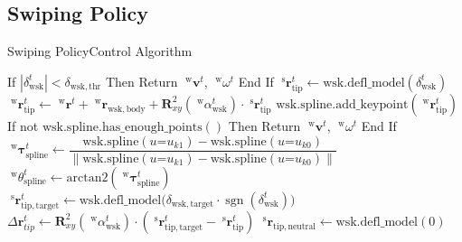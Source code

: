 \documentclass[AIRbeamer
,optEnglish
,optBiber
,optBibstyleAlphabetic
,optBeamerClassicFormat%
]{AIRlatex}
\begin{document}
    \subsection{Swiping Policy}
    \begin{frame}{Swiping Policy}{Control Algorithm}
        \begin{algorithm}[H]
            \caption{Swiping Policy}
            \begin{algorithmic}[1]
                {
                    \State If \(|\delta_{\mathrm{wsk}}^{t}| < \delta_{\mathrm{wsk, thr}}\)
                    Then
                    \State \quad Return \(\;^{\mathrm{w}}\boldsymbol{v}^{t}\), \(\;^{\mathrm{w}}\omega^{t}\)
                    \State End If
                    \State
                    \State \(\;^{\mathrm{s}}\boldsymbol{r}_{\mathrm{tip}}^{t} \gets \mathrm{wsk.defl\_model}(\delta_{\mathrm{wsk}}^{t})\)
                    \State \(\;^{\mathrm{w}}\boldsymbol{r}_{\mathrm{tip}}^{t} \gets \;^{\mathrm{w}}\boldsymbol{r}^{t} + \;^{\mathrm{w}}\boldsymbol{r}_{\mathrm{wsk, body}} + \boldsymbol{R}_{xy}^{2}(\; ^{\mathrm{w}}\alpha_{\mathrm{wsk}}^{t}) \cdot \;^{\mathrm{s}}\boldsymbol{r}_{\mathrm{tip}}^{t}\)
                    \State \(\mathrm{wsk.spline.add\_keypoint}(\;^{\mathrm{w}}\boldsymbol{r}_{\mathrm{tip}}^{t})\)
                    \State If not \(\mathrm{wsk.spline.has\_enough\_points()}\)
                    Then
                    \State \quad Return \(\;^{\mathrm{w}}\boldsymbol{v}^{t}\), \(\;^{\mathrm{w}}\omega^{t}\)
                    \State End If
                }
                {
                    \setcounter{ALG@line}{10}
                    \State \(\;^{\mathrm{w}}\boldsymbol{\tau}_{\mathrm{spline}}^{t} \gets \dfrac{\mathrm{wsk.spline}(u\mathord{=}u_{k1}) - \mathrm{wsk.spline}(u\mathord{=}u_{k0})}{\|\mathrm{wsk.spline}(u\mathord{=}u_{k1}) - \mathrm{wsk.spline}(u\mathord{=}u_{k0})\|}\)
                    \State \(\;^{\mathrm{w}}\theta_{\mathrm{spline}}^{t} \gets \mathrm{arctan2}(\;^{\mathrm{w}}\boldsymbol{\tau}_{\mathrm{spline}}^{t})\)
                    \State \(\;^{\mathrm{s}}\boldsymbol{r}_{\mathrm{tip, target}}^{t} \gets \mathrm{wsk.defl\_model}\big(\delta_{\mathrm{wsk, target}} \cdot \operatorname{sgn}(\delta_{\mathrm{wsk}}^{t})\big)\)
                    \State \(\Delta\boldsymbol{r}_{tip}^{t} \gets \boldsymbol{R}_{xy}^{2}(\; ^{\mathrm{w}}\alpha_{\mathrm{wsk}}^{t}) \cdot (\;^{\mathrm{s}}\boldsymbol{r}_{\mathrm{tip, target}}^{t} - \;^{\mathrm{s}}\boldsymbol{r}_{\mathrm{tip}}^{t})\)
                    \State \(\;^{\mathrm{s}}\boldsymbol{r}_{\mathrm{tip, neutral}} \gets \mathrm{wsk.defl\_model}(0)\)
}
\end{algorithmic}
\end{algorithm}
\end{frame}
\end{document}
